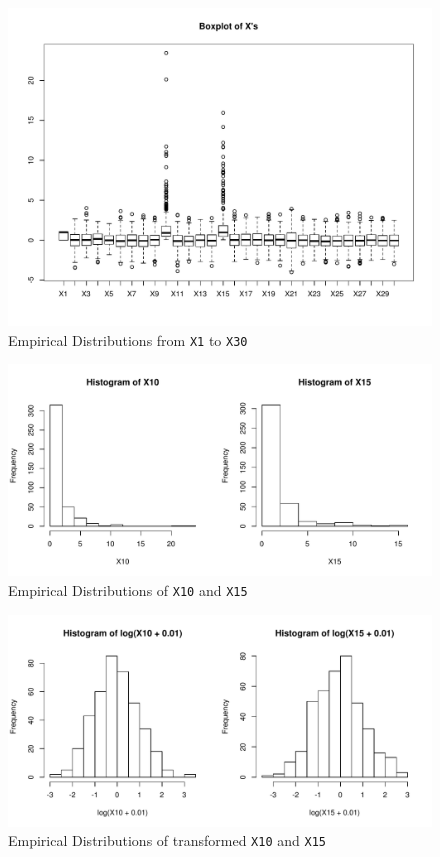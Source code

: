 \documentclass[11pt,oneside,a4paper]{article}
\newcommand{\m}[1]{\texttt{{#1}}}
\begin{document}
\begin{figure}[!ht]
    \centering
	\includegraphics[scale=0.8]{./pic/fig2_boxplot.pdf}
    \caption{Empirical Distributions from \m{X1} to \m{X30}}
 	\label{boxX}
\end{figure}

\begin{figure}[!ht]
    \centering
	\includegraphics[scale=0.8]{./pic/fig3_histX10X15.pdf}
    \caption{Empirical Distributions of \m{X10} and \m{X15}}
 	\label{distX10X15}
\end{figure}

\begin{figure}[!ht]
    \centering
	\includegraphics[scale=0.8]{./pic/fig4_histX10X15_trans.pdf}
    \caption{Empirical Distributions of transformed \m{X10} and \m{X15}}
 	\label{distX10X15_trans}
\end{figure}
\end{document}
